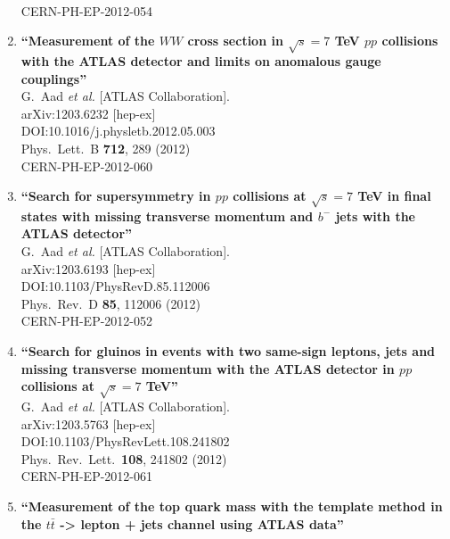 \documentclass{article}
\begin{document}
\begin{enumerate}
  \\{}CERN-PH-EP-2012-054
\item%
{\bf ``Measurement of the $W W$ cross section in $\sqrt{s}=7$ TeV $pp$ collisions with the ATLAS detector and limits on anomalous gauge couplings''}
  \\{}G.~Aad {\it et al.} [ATLAS Collaboration].
  \\{}arXiv:1203.6232 [hep-ex]
  \\{}DOI:10.1016/j.physletb.2012.05.003
  \\{}Phys.\ Lett.\ B {\bf 712}, 289 (2012)
  \\{}CERN-PH-EP-2012-060
\item%
{\bf ``Search for supersymmetry in $pp$ collisions at $\sqrt{s}=7$ TeV in final states with missing transverse momentum and $b^-$ jets with the ATLAS detector''}
  \\{}G.~Aad {\it et al.} [ATLAS Collaboration].
  \\{}arXiv:1203.6193 [hep-ex]
  \\{}DOI:10.1103/PhysRevD.85.112006
  \\{}Phys.\ Rev.\ D {\bf 85}, 112006 (2012)
  \\{}CERN-PH-EP-2012-052
\item%
{\bf ``Search for gluinos in events with two same-sign leptons, jets and missing transverse momentum with the ATLAS detector in $pp$ collisions at $\sqrt{s}=7$ TeV''}
  \\{}G.~Aad {\it et al.} [ATLAS Collaboration].
  \\{}arXiv:1203.5763 [hep-ex]
  \\{}DOI:10.1103/PhysRevLett.108.241802
  \\{}Phys.\ Rev.\ Lett.\  {\bf 108}, 241802 (2012)
  \\{}CERN-PH-EP-2012-061
\item%
{\bf ``Measurement of the top quark mass with the template method in the $t \bar{t}$ -> lepton + jets channel using ATLAS data''}

\end{enumerate}
\end{document}

